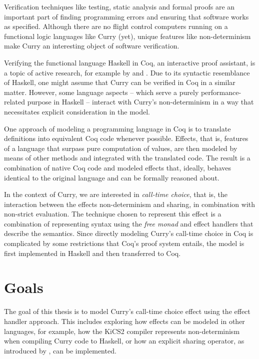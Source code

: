 \documentclass[a4paper, 11pt, fleqn, twoside, abstract=on]{scrreprt}
\begin{document}
Verification techniques like testing, static analysis and formal proofs are an important part of finding programming errors and ensuring that software works as specified.
Although there are no flight control computers running on a functional logic languages like Curry (yet), unique features like non-determinism make Curry an interesting object of software verification.

Verifying the functional language Haskell in Coq, an interactive proof assistant, is a topic of active research, for example by \citet{breitner2018ready} and \citet{dylus2019oneMonad}.
Due to its syntactic resemblance of Haskell, one might assume that Curry can be verified in Coq in a similar matter.
However, some language aspects -- which serve a purely performance-related purpose in Haskell -- interact with Curry's non-determinism in a way that necessitates explicit consideration in the model.

One approach of modeling a programming language in Coq is to translate definitions into equivalent Coq code whenever possible.
Effects, that is, features of a language that surpass pure computation of values, are then modeled by means of other methods and integrated with the translated code.
The result is a combination of native Coq code and modeled effects that, ideally, behaves identical to the original language and can be formally reasoned about.

In the context of Curry, we are interested in \textit{call-time choice}, that is, the interaction between the effects non-determinism and sharing, in combination with non-strict evaluation.
The technique chosen to represent this effect is a combination of representing syntax using the \textit{free monad} and effect handlers that describe the semantics.
Since directly modeling Curry's call-time choice in Coq is complicated by some restrictions that Coq's proof system entails, the model is first implemented in Haskell and then transferred to Coq.

\section{Goals}

The goal of this thesis is to model Curry's call-time choice effect using the effect handler approach.
This includes exploring how effects can be modeled in other languages, for example, how the KiCS2 compiler represents non-determinism when compiling Curry code to Haskell, or how an explicit sharing operator, as introduced by \citet{fischer2009purely}, can be implemented.
\end{document}
